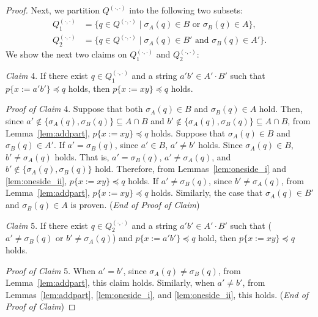 \begin{proof}
Next, we partition $Q^{(\cdot,\cdot)}$ into the following two subsets:
\begin{align*}
  Q_{1}^{(\cdot,\cdot)} & = \{q \in Q^{(\cdot,\cdot)} \mid \sigma_{A}(q) \in B \mbox{ or } \sigma_{B}(q) \in A\},\\
  Q_{2}^{(\cdot,\cdot)} & = \{q \in Q^{(\cdot,\cdot)} \mid \sigma_{A}(q) \in B' \mbox{ and } \sigma_{B}(q) \in A'\}.
\end{align*}
We show the next two claims on $Q_{1}^{(\cdot,\cdot)}$ and $Q_{2}^{(\cdot,\cdot)}$:

\smallskip

\noindent
\textit{Claim} 4.
If there exist $q \in Q_{1}^{(\cdot,\cdot)}$ and a string $a'b' \in A'\cdot B'$ such that $p\{x:=a'b'\} \preceq q$ holds, then $p\{x:=xy\} \preceq q$ holds.

\smallskip

\noindent
\textit{Proof of Claim} 4.
Suppose that both $\sigma_{A}(q) \in B$ and $\sigma_{B}(q) \in A$ hold. Then, since $a' \not\in \{\sigma_{A}(q), \sigma_{B}(q)\} \subseteq A\cap B$ and $b' \not\in \{\sigma_{A}(q), \sigma_{B}(q)\} \subseteq A\cap B$, from Lemma~\ref{lem:addpart}, $p\{x:=xy\} \preceq q$ holds.
Suppose that $\sigma_{A}(q)\in B$ and $\sigma_{B}(q)\in A'$.
If $a' = \sigma_{B}(q)$, since $a' \in B$, $a' \not= b'$ holds.
Since $\sigma_{A}(q)\in B$, $b' \not= \sigma_{A}(q)$ holds.
That is, $a' = \sigma_{B}(q)$, $a' \not= \sigma_{A}(q)$, and $b' \not\in \{\sigma_{A}(q), \sigma_{B}(q)\}$ hold.
Therefore, from Lemmas~\ref{lem:oneside_i} and \ref{lem:oneside_ii}, $p\{x:=xy\} \preceq q$ holds.
If $a' \not= \sigma_{B}(q)$, since $b' \not= \sigma_{A}(q)$, from Lemma~\ref{lem:addpart}, $p\{x:=xy\} \preceq q$ holds.
Similarly, the case that $\sigma_{A}(q)\in B'$ and $\sigma_{B}(q)\in A$ is proven. (\textit{End of Proof of Claim})

\smallskip

\noindent
\textit{Claim} 5.
If there exist $q \in Q_{2}^{(\cdot,\cdot)}$ and a string $a'b' \in A'\cdot B'$ such that ($a' \not= \sigma_{B}(q)$ or $b' \not= \sigma_{A}(q)$) and $p\{x:=a'b'\} \preceq q$ hold, then $p\{x:=xy\} \preceq q$ holds.
 
\smallskip

\noindent
\textit{Proof of Claim} 5.
When $a'=b'$, since $\sigma_{A}(q) \not= \sigma_{B}(q)$, from Lemma~\ref{lem:addpart}, this claim holds. Similarly, when $a' \not = b'$, from Lemmas~\ref{lem:addpart}, \ref{lem:oneside_i}, and \ref{lem:oneside_ii}, this holds.  (\textit{End of Proof of Claim})
  

\end{proof}
